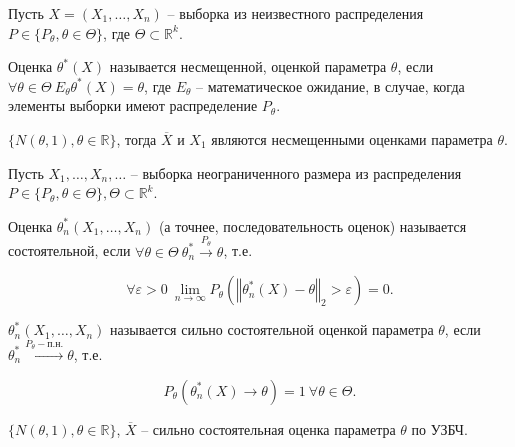 Пусть $\displaystyle X=( X_{1} ,\dotsc ,X_{n})$ -- выборка из неизвестного распределения $\displaystyle P\in \{P_{\theta } ,\theta \in \Theta \}$, где $\displaystyle \Theta \subset \mathbb{R}^{k}$.
\begin{definition}
Оценка $\displaystyle \theta ^{*}( X)$ называется несмещенной, оценкой параметра $\displaystyle \theta $, если $\displaystyle \forall \theta \in \Theta \ E_{\theta } \theta ^{*}( X) =\theta $, где $\displaystyle E_{\theta }$ -- математическое ожидание, в случае, когда элементы выборки имеют распределение $\displaystyle P_{\theta }$.
\end{definition}
\begin{example}
$\displaystyle \{N( \theta ,1) ,\theta \in \mathbb{R}\}$, тогда $\displaystyle \overline{X}$ и $\displaystyle X_{1}$ являются несмещенными оценками параметра $\displaystyle \theta $.
\end{example}
Пусть $\displaystyle X_{1} ,\dotsc ,X_{n} ,\dotsc $ -- выборка неограниченного размера из распределения $\displaystyle P\in \{P_{\theta } ,\theta \in \Theta \} ,\Theta \subset \mathbb{R}^{k}$.
\begin{definition}
Оценка $\displaystyle \theta _{n}^{*}( X_{1} ,\dotsc ,X_{n})$ (а точнее, последовательность оценок) называется состоятельной, если $\displaystyle \forall \theta \in \Theta \ \theta _{n}^{*}\xrightarrow{P_{\theta }} \theta $, т.е.


\begin{equation*}
\forall \varepsilon  >0\ \lim _{n\rightarrow \infty } P_{\theta }\left(\left\Vert \theta _{n}^{*}( X) -\theta \right\Vert _{2}  >\varepsilon \right) =0.
\end{equation*}
\end{definition}
\begin{definition}
$\displaystyle \theta _{n}^{*}( X_{1} ,\dotsc ,X_{n})$ называется сильно состоятельной оценкой параметра $\displaystyle \theta $, если $\displaystyle \theta _{n}^{*}\xrightarrow{P_{\theta } -п.н.} \theta $, т.е.


\begin{equation*}
P_{\theta }\left( \theta _{n}^{*}( X)\rightarrow \theta \right) =1\ \forall \theta \in \Theta .
\end{equation*}
\end{definition}
\begin{example}
$\displaystyle \{N( \theta ,1) ,\theta \in \mathbb{R}\}$, $\displaystyle \overline{X}$ -- сильно состоятельная оценка параметра $\displaystyle \theta $ по УЗБЧ.
\end{example}
